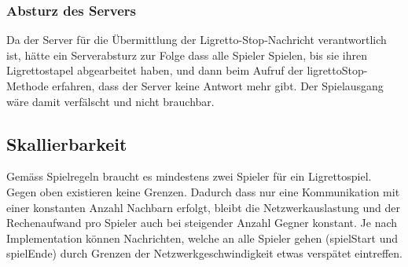\subsubsection{Absturz des Servers}
Da der Server für die Übermittlung der Ligretto-Stop-Nachricht verantwortlich ist, hätte ein Serverabsturz zur Folge dass alle Spieler Spielen, bis sie ihren Ligrettostapel abgearbeitet haben, und dann beim Aufruf der ligrettoStop-Methode erfahren, dass der Server keine Antwort mehr gibt. Der Spielausgang wäre damit verfälscht und nicht brauchbar.

\subsection{Skallierbarkeit}

Gemäss Spielregeln braucht es mindestens zwei Spieler für ein Ligrettospiel. Gegen oben existieren keine Grenzen. Dadurch dass nur eine Kommunikation mit einer konstanten Anzahl Nachbarn erfolgt, bleibt die Netzwerkauslastung und der Rechenaufwand pro Spieler auch bei steigender Anzahl Gegner konstant. Je nach Implementation können Nachrichten, welche an alle Spieler gehen (spielStart und spielEnde) durch Grenzen der Netzwerkgeschwindigkeit etwas verspätet eintreffen.

